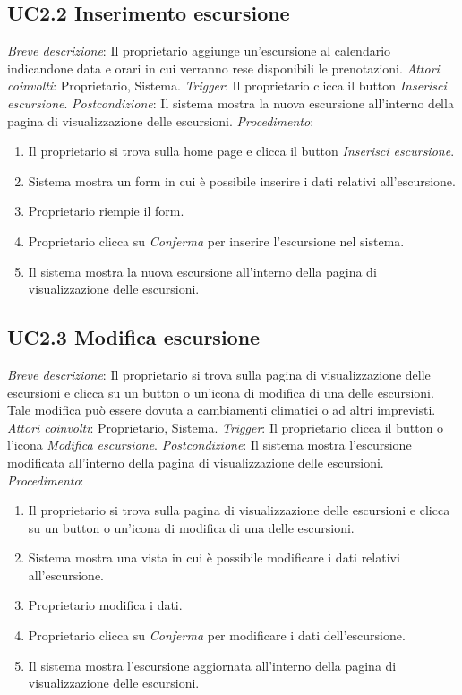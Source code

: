 \subsection{UC2.2 Inserimento escursione}

\noindent \emph{Breve descrizione}: Il proprietario aggiunge un'escursione al calendario indicandone data e orari in cui verranno rese disponibili le prenotazioni.\medbreak
\noindent \emph{Attori coinvolti}: Proprietario, Sistema.\medbreak
\noindent \emph{Trigger}: Il proprietario clicca il button \textit{Inserisci escursione}.\medbreak
\noindent \emph{Postcondizione}: Il sistema mostra la nuova escursione all'interno della pagina di visualizzazione delle escursioni.\medbreak
\noindent \emph{Procedimento}:

\begin{enumerate}
    \item Il proprietario si trova sulla home page e clicca il button \textit{Inserisci escursione}.
    \item Sistema mostra un form in cui è possibile inserire i dati relativi all'escursione.
    \item Proprietario riempie il form.
    \item Proprietario clicca su \textit{Conferma} per inserire l'escursione nel sistema.
    \item Il sistema mostra la nuova escursione all'interno della pagina di visualizzazione delle escursioni.
\end{enumerate}

\subsection{UC2.3 Modifica escursione}

\noindent \emph{Breve descrizione}: Il proprietario si trova sulla pagina di visualizzazione delle escursioni e clicca su un button o un'icona di modifica di una delle escursioni.
Tale modifica può essere dovuta a cambiamenti climatici o ad altri imprevisti.\medbreak
\noindent \emph{Attori coinvolti}: Proprietario, Sistema.\medbreak
\noindent \emph{Trigger}: Il proprietario clicca il button o l'icona \textit{Modifica escursione}.\medbreak
\noindent \emph{Postcondizione}: Il sistema mostra l'escursione modificata all'interno della pagina di visualizzazione delle escursioni.\medbreak
\noindent \emph{Procedimento}:

\begin{enumerate}
    \item Il proprietario si trova sulla pagina di visualizzazione delle escursioni e clicca su un button o un'icona di modifica di una delle escursioni.
    \item Sistema mostra una vista in cui è possibile modificare i dati relativi all'escursione.
    \item Proprietario modifica i dati.
    \item Proprietario clicca su \textit{Conferma} per modificare i dati dell'escursione.
    \item Il sistema mostra l'escursione aggiornata all'interno della pagina di visualizzazione delle escursioni.
\end{enumerate}

